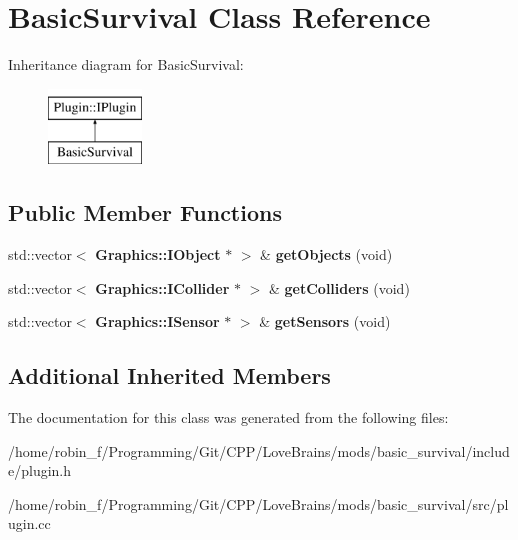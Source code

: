 \section{Basic\+Survival Class Reference}
\label{class_basic_survival}
Inheritance diagram for Basic\+Survival\+:\begin{figure}[H]
\begin{center}
\leavevmode
\includegraphics[height=2.000000cm]{class_basic_survival}
\end{center}
\end{figure}
\subsection*{Public Member Functions}
\begin{DoxyCompactItemize}
\item 
std\+::vector$<$ {\bf Graphics\+::\+I\+Object} $\ast$ $>$ \& {\bfseries get\+Objects} (void)\label{class_basic_survival_ae9076786eb5100c347ae4b8653d4eda3}

\item 
std\+::vector$<$ {\bf Graphics\+::\+I\+Collider} $\ast$ $>$ \& {\bfseries get\+Colliders} (void)\label{class_basic_survival_aae2f585829a266b8a47de45e9e1109e7}

\item 
std\+::vector$<$ {\bf Graphics\+::\+I\+Sensor} $\ast$ $>$ \& {\bfseries get\+Sensors} (void)\label{class_basic_survival_a496e2fa34d0e7c23e0db7e7ac86fc214}

\end{DoxyCompactItemize}
\subsection*{Additional Inherited Members}


The documentation for this class was generated from the following files\+:\begin{DoxyCompactItemize}
\item 
/home/robin\+\_\+f/\+Programming/\+Git/\+C\+P\+P/\+Love\+Brains/mods/basic\+\_\+survival/include/plugin.\+h\item 
/home/robin\+\_\+f/\+Programming/\+Git/\+C\+P\+P/\+Love\+Brains/mods/basic\+\_\+survival/src/plugin.\+cc\end{DoxyCompactItemize}

